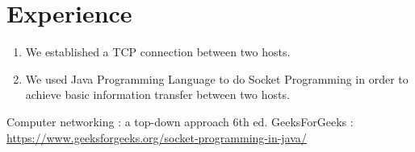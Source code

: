 \documentclass[11pt]{article}
\begin{document}
\newpage
\newpage
\section{Experience}
\begin{enumerate}
\item We established a TCP connection between two hosts.
\item We used Java Programming Language to do Socket Programming in order to achieve basic information transfer between two hosts.
\end{enumerate}

\begin{thebibliography}{1}
  Computer networking : a top-down approach 6th ed.
 GeeksForGeeks : \url{https://www.geeksforgeeks.org/socket-programming-in-java/}

\end{thebibliography}
\end{document}
